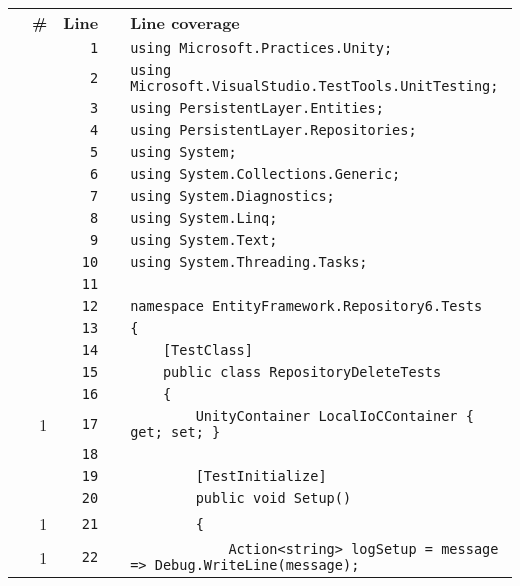 \documentclass[a4paper,10pt]{article}
\begin{document}
\begin{longtable}[l]{lrrll}
\textbf{} & \textbf{\#} & \textbf{Line} & \textbf{} & \textbf{Line coverage}\\
\cellcolor{gray} &  & \verb~1~ & & \verb~using Microsoft.Practices.Unity;~\\
\cellcolor{gray} &  & \verb~2~ & & \verb~using Microsoft.VisualStudio.TestTools.UnitTesting;~\\
\cellcolor{gray} &  & \verb~3~ & & \verb~using PersistentLayer.Entities;~\\
\cellcolor{gray} &  & \verb~4~ & & \verb~using PersistentLayer.Repositories;~\\
\cellcolor{gray} &  & \verb~5~ & & \verb~using System;~\\
\cellcolor{gray} &  & \verb~6~ & & \verb~using System.Collections.Generic;~\\
\cellcolor{gray} &  & \verb~7~ & & \verb~using System.Diagnostics;~\\
\cellcolor{gray} &  & \verb~8~ & & \verb~using System.Linq;~\\
\cellcolor{gray} &  & \verb~9~ & & \verb~using System.Text;~\\
\cellcolor{gray} &  & \verb~10~ & & \verb~using System.Threading.Tasks;~\\
\cellcolor{gray} &  & \verb~11~ & & \verb~~\\
\cellcolor{gray} &  & \verb~12~ & & \verb~namespace EntityFramework.Repository6.Tests~\\
\cellcolor{gray} &  & \verb~13~ & & \verb~{~\\
\cellcolor{gray} &  & \verb~14~ & & \verb~    [TestClass]~\\
\cellcolor{gray} &  & \verb~15~ & & \verb~    public class RepositoryDeleteTests~\\
\cellcolor{gray} &  & \verb~16~ & & \verb~    {~\\
\cellcolor{green} & 1 & \verb~17~ & & \verb~        UnityContainer LocalIoCContainer { get; set; }~\\
\cellcolor{gray} &  & \verb~18~ & & \verb~~\\
\cellcolor{gray} &  & \verb~19~ & & \verb~        [TestInitialize]~\\
\cellcolor{gray} &  & \verb~20~ & & \verb~        public void Setup()~\\
\cellcolor{green} & 1 & \verb~21~ & & \verb~        {~\\
\cellcolor{green} & 1 & \verb~22~ & & \verb~            Action<string> logSetup = message => Debug.WriteLine(message);~\\

\end{longtable}
\end{document}
